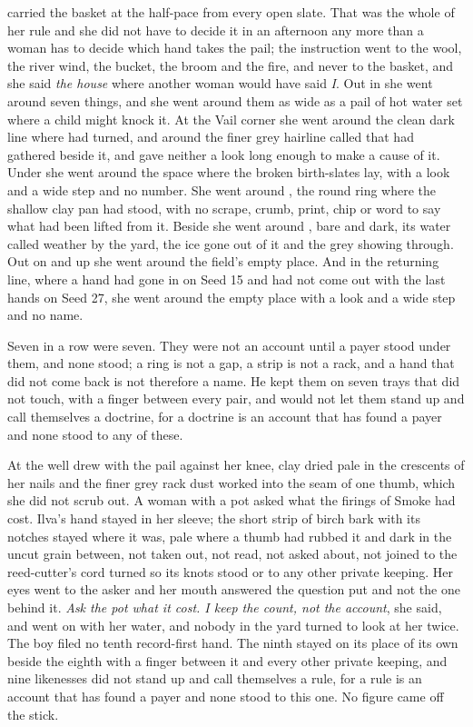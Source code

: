  carried the basket at the half-pace from every open slate. That was the whole of her rule and she did not have to decide it in an afternoon any more than a woman has to decide which hand takes the pail; the instruction went to the wool, the river wind, the bucket, the broom and the fire, and never to the basket, and she said \emph{the house} where another woman would have said \emph{I}. Out in  she went around seven things, and she went around them as wide as a pail of hot water set where a child might knock it. At the Vail corner she went around the clean dark line where  had turned, and around the finer grey hairline called  that had gathered beside it, and gave neither a look long enough to make a cause of it. Under  she went around the space where the broken birth-slates lay, with a look and a wide step and no number. She went around , the round ring where the shallow clay pan had stood, with no scrape, crumb, print, chip or word to say what had been lifted from it. Beside  she went around , bare and dark, its water called weather by the yard, the ice gone out of it and the grey showing through. Out on  and up  she went around the field's empty place. And in the returning line, where a hand had gone in on Seed 15 and had not come out with the last hands on Seed 27, she went around the empty place with a look and a wide step and no name.

Seven in a row were seven. They were not an account until a payer stood under them, and none stood; a ring is not a gap, a strip is not a rack, and a hand that did not come back is not therefore a name. He kept them on seven trays that did not touch, with a finger between every pair, and would not let them stand up and call themselves a doctrine, for a doctrine is an account that has found a payer and none stood to any of these.

At the well  drew with the pail against her knee, clay dried pale in the crescents of her nails and the finer grey rack dust worked into the seam of one thumb, which she did not scrub out. A woman with a pot asked what the firings of Smoke had cost. Ilva's hand stayed in her sleeve; the short strip of birch bark with its notches stayed where it was, pale where a thumb had rubbed it and dark in the uncut grain between, not taken out, not read, not asked about, not joined to the reed-cutter's cord turned so its knots stood or to any other private keeping. Her eyes went to the asker and her mouth answered the question put and not the one behind it. \emph{Ask the pot what it cost. I keep the count, not the account}, she said, and went on with her water, and nobody in the yard turned to look at her twice. The boy filed no tenth record-first hand. The ninth stayed on its place of its own beside the eighth with a finger between it and every other private keeping, and nine likenesses did not stand up and call themselves a rule, for a rule is an account that has found a payer and none stood to this one. No figure came off the stick.

